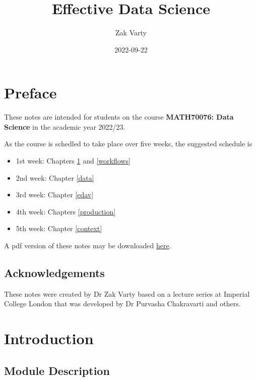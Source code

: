 \documentclass[
  12pt,
]{book}
\title{Effective Data Science}
\author{Zak Varty}
\date{2022-09-22}
\providecommand{\tightlist}{%
  \setlength{\itemsep}{0pt}\setlength{\parskip}{0pt}}
\theoremstyle{definition}
\theoremstyle{definition}
\theoremstyle{definition}
\theoremstyle{definition}
\theoremstyle{remark}
\begin{document}
\maketitle

{
\setcounter{tocdepth}{1}
\tableofcontents
}
\hypertarget{preface}{%
\chapter*{Preface}\label{preface}}

These notes are intended for students on the course \textbf{MATH70076: Data Science} in the academic year 2022/23.

As the course is schedled to take place over five weeks, the suggested schedule is

\begin{itemize}
\tightlist
\item
  1st week: Chapters \ref{intro} and \ref{workflows}
\item
  2nd week: Chapter \ref{data}
\item
  3rd week: Chapter \ref{edav}
\item
  4th week: Chapters \ref{production}
\item
  5th week: Chapter \ref{context}
\end{itemize}

A pdf version of these notes may be downloaded \href{./data_science_notes.pdf}{here}.

\hypertarget{acknowledgements}{%
\section*{Acknowledgements}\label{acknowledgements}}

These notes were created by Dr Zak Varty based on a lecture series at Imperial College London that was developed by Dr Purvasha Chakravarti and others.

\hypertarget{intro}{%
\chapter{Introduction}\label{intro}}

\hypertarget{module-description}{%
\section{Module Description}\label{module-description}}
\end{document}
